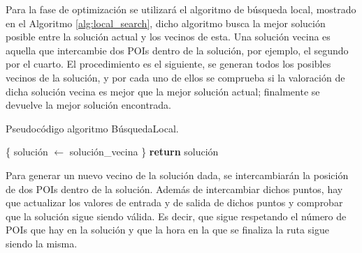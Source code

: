 Para la fase de optimización se utilizará el algoritmo de búsqueda local, mostrado en el Algoritmo \ref{alg:local_search}, dicho algoritmo busca la mejor solución posible entre la solución actual y los vecinos de esta. Una solución vecina es aquella que intercambie dos POIs dentro de la solución, por ejemplo, el segundo por el cuarto. El procedimiento es el siguiente, se generan todos los posibles vecinos de la solución, y por cada uno de ellos se comprueba si la valoración de dicha solución vecina es mejor que la mejor solución actual; finalmente se devuelve la mejor solución encontrada.\newline
\newpage

\begin{algorithm}[H]
	\caption{Pseudocódigo algoritmo BúsquedaLocal.}
	\label{alg:local_search}
	\begin{algorithmic}
		 \{
			\State solución $\gets$ solución\_vecina
		\EndIf
		\State \}
		\EndFor
		\State \textbf{return} solución
		\EndFunction
	\end{algorithmic}
\end{algorithm}

Para generar un nuevo vecino de la solución dada, se intercambiarán la posición de dos POIs dentro de la solución. Además de intercambiar dichos puntos, hay que actualizar los valores de entrada y de salida de dichos puntos y comprobar que la solución sigue siendo válida. Es decir, que sigue respetando el número de POIs que hay en la solución y que la hora en la que se finaliza la ruta sigue siendo la misma.



